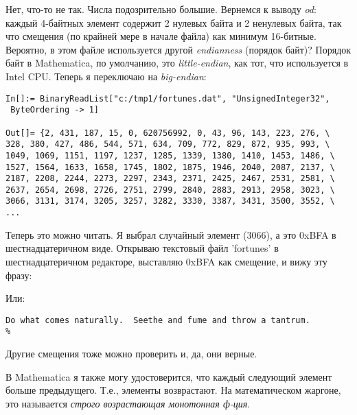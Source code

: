 Нет, что-то не так. Числа подозрительно большие.
Вернемся к выводу \emph{od}: каждый 4-байтных элемент содержит 2 нулевых байта и 2 ненулевых байта,
так что смещения (по крайней мере в начале файла) как минимум 16-битные.
Вероятно, в этом файле используется другой \emph{endianness} (порядок байт)?
Порядок байт в Mathematica, по умолчанию, это \emph{little-endian}, как тот, что используется в Intel CPU.
Теперь я переключаю на \emph{big-endian}:

\begin{lstlisting}[style=custommath]
In[]:= BinaryReadList["c:/tmp1/fortunes.dat", "UnsignedInteger32", 
 ByteOrdering -> 1]

Out[]= {2, 431, 187, 15, 0, 620756992, 0, 43, 96, 143, 223, 276, \
328, 380, 427, 486, 544, 571, 634, 709, 772, 829, 872, 935, 993, \
1049, 1069, 1151, 1197, 1237, 1285, 1339, 1380, 1410, 1453, 1486, \
1527, 1564, 1633, 1658, 1745, 1802, 1875, 1946, 2040, 2087, 2137, \
2187, 2208, 2244, 2273, 2297, 2343, 2371, 2425, 2467, 2531, 2581, \
2637, 2654, 2698, 2726, 2751, 2799, 2840, 2883, 2913, 2958, 3023, \
3066, 3131, 3174, 3205, 3257, 3282, 3330, 3387, 3431, 3500, 3552, \
...
\end{lstlisting}

Теперь это можно читать.
Я выбрал случайный элемент (3066), а это 0xBFA в шестнадцатеричном виде.
Открываю текстовый файл 'fortunes' в шестнадцатеричном редакторе, выставляю 0xBFA как смещение, и вижу эту фразу:



Или:

\begin{lstlisting}
Do what comes naturally.  Seethe and fume and throw a tantrum.
%
\end{lstlisting}

Другие смещения тоже можно проверить и, да, они верные.

В Mathematica я также могу удостоверится, что каждый следующий элемент больше предыдущего.
Т.е., элементы возврастают.
На математическом жаргоне, это называется \emph{строго возрастающая монотонная ф-ция}.

